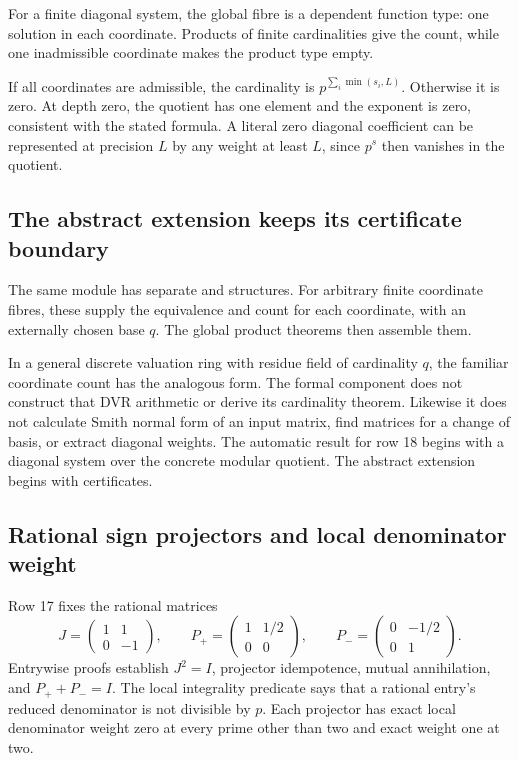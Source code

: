 For a finite diagonal system, the global fibre is a dependent function type: one solution in each coordinate. Products of finite cardinalities give the count, while one inadmissible coordinate makes the product type empty.

If all coordinates are admissible, the cardinality is $p^{\sum_i\min(s_i,L)}$. Otherwise it is zero. At depth zero, the quotient has one element and the exponent is zero, consistent with the stated formula. A literal zero diagonal coefficient can be represented at precision $L$ by any weight at least $L$, since $p^s$ then vanishes in the quotient.

\subsection{The abstract extension keeps its certificate boundary}

The same module has separate  and  structures. For arbitrary finite coordinate fibres, these supply the equivalence and count for each coordinate, with an externally chosen base $q$. The global product theorems then assemble them.

In a general discrete valuation ring with residue field of cardinality $q$, the familiar coordinate count has the analogous form. The formal component does not construct that DVR arithmetic or derive its cardinality theorem. Likewise it does not calculate Smith normal form of an input matrix, find matrices for a change of basis, or extract diagonal weights. The automatic result for row 18 begins with a diagonal system over the concrete modular quotient. The abstract extension begins with certificates.

\subsection{Rational sign projectors and local denominator weight}

Row 17 fixes the rational matrices
\[
J=\begin{pmatrix}1&1\\0&-1\end{pmatrix},\qquad
P_+=\begin{pmatrix}1&1/2\\0&0\end{pmatrix},\qquad
P_-=\begin{pmatrix}0&-1/2\\0&1\end{pmatrix}.
\]
Entrywise proofs establish $J^2=I$, projector idempotence, mutual annihilation, and $P_++P_-=I$. The local integrality predicate says that a rational entry's reduced denominator is not divisible by $p$. Each projector has exact local denominator weight zero at every prime other than two and exact weight one at two.

